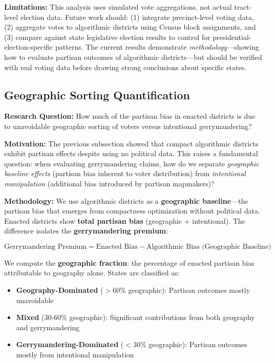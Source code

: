 \textbf{Limitations:} This analysis uses simulated vote aggregations, not actual tract-level election data. Future work should:
(1) integrate precinct-level voting data, (2) aggregate votes to algorithmic districts using Census block assignments, and (3) compare against state legislative election results to control for presidential-election-specific patterns. The current results demonstrate \textit{methodology}—showing how to evaluate partisan outcomes of algorithmic districts—but should be verified with real voting data before drawing strong conclusions about specific states.

\subsection{Geographic Sorting Quantification}

\textbf{Research Question:} How much of the partisan bias in enacted districts is due to unavoidable geographic sorting of voters versus intentional gerrymandering?

\textbf{Motivation:} The previous subsection showed that compact algorithmic districts exhibit partisan effects despite using no political data. This raises a fundamental question: when evaluating gerrymandering claims, how do we separate \textit{geographic baseline effects} (partisan bias inherent to voter distribution) from \textit{intentional manipulation} (additional bias introduced by partisan mapmakers)?

\textbf{Methodology:} We use algorithmic districts as a \textbf{geographic baseline}—the partisan bias that emerges from compactness optimization without political data. Enacted districts show \textbf{total partisan bias} (geographic + intentional). The difference isolates the \textbf{gerrymandering premium}:

\begin{equation*}
\text{Gerrymandering Premium} = \text{Enacted Bias} - \text{Algorithmic Bias (Geographic Baseline)}
\end{equation*}

We compute the \textbf{geographic fraction}: the percentage of enacted partisan bias attributable to geography alone. States are classified as:
\begin{itemize}
    \item \textbf{Geography-Dominated} ($>$60\% geographic): Partisan outcomes mostly unavoidable
    \item \textbf{Mixed} (30-60\% geographic): Significant contributions from both geography and gerrymandering
    \item \textbf{Gerrymandering-Dominated} ($<$30\% geographic): Partisan outcomes mostly from intentional manipulation
\end{itemize}

